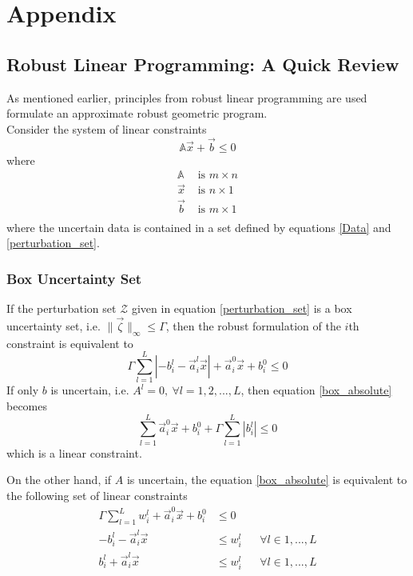 \section*{Appendix}

\subsection{Robust Linear Programming: A Quick Review} \label{LP_to_GP}

As mentioned earlier, principles from robust linear programming are used
formulate an approximate robust geometric program.\\[12pt]
Consider the system of linear constraints
\begin{equation*}
    \mathbb{A}\vec{x} + \vec{b} \leq 0
\end{equation*}
where
\begin{equation*}
\begin{aligned}
\mathbb{A} &\text{ is $m \times n$}\\
\vec{x} &\text{ is $n \times 1$}\\
\vec{b} &\text{ is $m \times 1$}\\
\end{aligned}
\end{equation*}
where the uncertain data is contained in a set defined by equations \eqref{Data} and \eqref{perturbation_set}.

\subsubsection{Box Uncertainty Set}
If the perturbation set $\mathcal{Z}$ given in equation \eqref{perturbation_set} is a box
uncertainty set, i.e. $\|\vec{\zeta}\|_{\infty} \leq \Gamma$, then the robust formulation of the $i$th constraint is equivalent to
\begin{equation}
\Gamma \textstyle{\sum}_{l=1}^L |- {b}^l_{i} - \vec{a}^l_i\vec{x}| + \vec{a}^0_i\vec{x} + b^0_i \leq 0
\label{box_absolute}
\end{equation}
If only $b$ is uncertain, i.e. $A^l = 0,~\forall l = 1,2,...,L$, then equation \eqref{box_absolute} becomes
\begin{equation}
\textstyle{\sum}_{l=1}^L \vec{a}^0_{i}\vec{x} + b^0_{i} + \Gamma \textstyle{\sum}_{l=1}^L |b^l_{i}| \leq 0
\label{box_coeff}
\end{equation}
which is a linear constraint.

On the other hand, if $A$ is uncertain, the equation \eqref{box_absolute} is equivalent to the following set of linear constraints
\begin{equation}
\begin{aligned}
\Gamma \textstyle{\sum}_{l=1}^L w^l_{i} + \vec{a}^0_{i}\vec{x} + b^0_{i} &\leq 0\\
- b^l_{i} - \vec{a}^l_{i}\vec{x} &\leq w^l_{i} &&\forall l \in 1,...,L\\
b^l_{i} + \vec{a}^l_{i}\vec{x} &\leq w^l_{i} &&\forall l \in 1,...,L\\
\end{aligned}
\label{box_linear}
\end{equation}

